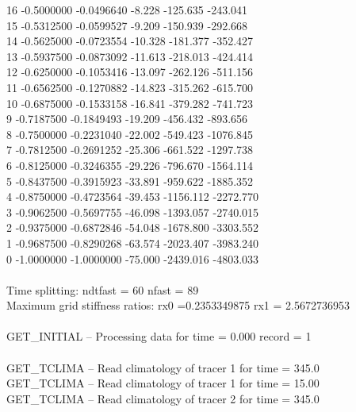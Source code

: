 16  -0.5000000  -0.0496640          -8.228    -125.635    -243.041\\
15  -0.5312500  -0.0599527          -9.209    -150.939    -292.668\\
14  -0.5625000  -0.0723554         -10.328    -181.377    -352.427\\
13  -0.5937500  -0.0873092         -11.613    -218.013    -424.414\\
12  -0.6250000  -0.1053416         -13.097    -262.126    -511.156\\
11  -0.6562500  -0.1270882         -14.823    -315.262    -615.700\\
10  -0.6875000  -0.1533158         -16.841    -379.282    -741.723\\
9  -0.7187500  -0.1849493         -19.209    -456.432    -893.656\\
8  -0.7500000  -0.2231040         -22.002    -549.423   -1076.845\\
7  -0.7812500  -0.2691252         -25.306    -661.522   -1297.738\\
6  -0.8125000  -0.3246355         -29.226    -796.670   -1564.114\\
5  -0.8437500  -0.3915923         -33.891    -959.622   -1885.352\\
4  -0.8750000  -0.4723564         -39.453   -1156.112   -2272.770\\
3  -0.9062500  -0.5697755         -46.098   -1393.057   -2740.015\\
2  -0.9375000  -0.6872846         -54.048   -1678.800   -3303.552\\
1  -0.9687500  -0.8290268         -63.574   -2023.407   -3983.240\\
0  -1.0000000  -1.0000000         -75.000   -2439.016   -4803.033\\
\\
Time splitting: ndtfast = 60    nfast = 89\\
Maximum grid stiffness ratios:   rx0 =0.2353349875  rx1 =  2.5672736953\\
\\
GET\_INITIAL -- Processing data for time =   0.000     record =   1\\
\\
GET\_TCLIMA -- Read climatology of tracer   1 for time =    345.0 \\
GET\_TCLIMA -- Read climatology of tracer   1 for time =    15.00 \\
GET\_TCLIMA -- Read climatology of tracer   2 for time =    345.0 \\
